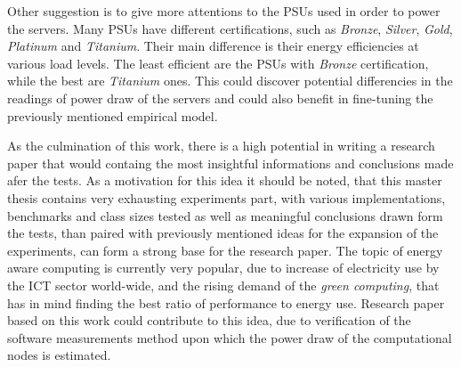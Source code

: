 Other suggestion is to give more attentions to the PSUs used in order to
power the servers. Many PSUs have different certifications, such as
\emph{Bronze}, \emph{Silver}, \emph{Gold}, \emph{Platinum} and \emph{Titanium}.
Their main difference is their energy efficiencies at various load levels.
The least efficient are the PSUs with \emph{Bronze} certification, while the
best are \emph{Titanium} ones. This could discover potential differencies
in the readings of power draw of the servers and could also benefit in
fine-tuning the previously mentioned empirical model.

As the culmination of this work, there is a high potential in writing
a research paper that would containg the most insightful informations
and conclusions made afer the tests. As a motivation for this idea it should
be noted, that this master thesis contains very exhausting experiments part,
with various implementations, benchmarks and class sizes tested as well as
meaningful conclusions drawn form the tests, than paired with previously
mentioned ideas for the expansion of the experiments, can form a strong base
for the research paper. The topic of energy aware computing is currently
very popular, due to increase of electricity use by the ICT sector world-wide,
and the rising demand of the \emph{green computing}, that has in mind finding
the best ratio of performance to energy use. Research paper based on this work
could contribute to this idea, due to verification of the software measurements
method upon which the power draw of the computational nodes is estimated.